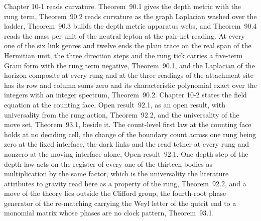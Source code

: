 Chapter 10-1 reads curvature. Theorem~90.1 gives the depth metric with the rung term, Theorem~90.2 reads curvature as the graph Laplacian washed over the ladder, Theorem~90.3 builds the depth metric apparatus webs, and Theorem~90.4 reads the mass per unit of the neutral lepton at the pair-ket reading. At every one of the six link genres and twelve ends the plain trace on the real span of the Hermitian unit, the three direction steps and the rung tick carries a five-term Gram form with the rung term negative, Theorem~90.1, and the Laplacian of the horizon composite at every rung and at the three readings of the attachment site has its row and column sums zero and its characteristic polynomial exact over the integers with an integer spectrum, Theorem~90.2. Chapter 10-2 states the field equation at the counting face, Open result~92.1, as an open result, with universality from the rung action, Theorem~92.2, and the universality of the move set, Theorem~93.1, beside it. The count-level first law at the counting face holds at no deciding cell, the change of the boundary count across one rung being zero at the fixed interface, the dark links and the read tether at every rung and nonzero at the moving interface alone, Open result~92.1. One depth step of the depth law acts on the register of every one of the thirteen bodies as multiplication by the same factor, which is the universality the literature attributes to gravity read here as a property of the rung, Theorem~92.2, and a move of the theory lies outside the Clifford group, the fourth-root phase generator of the re-matching carrying the Weyl letter of the qutrit end to a monomial matrix whose phases are no clock pattern, Theorem~93.1.

